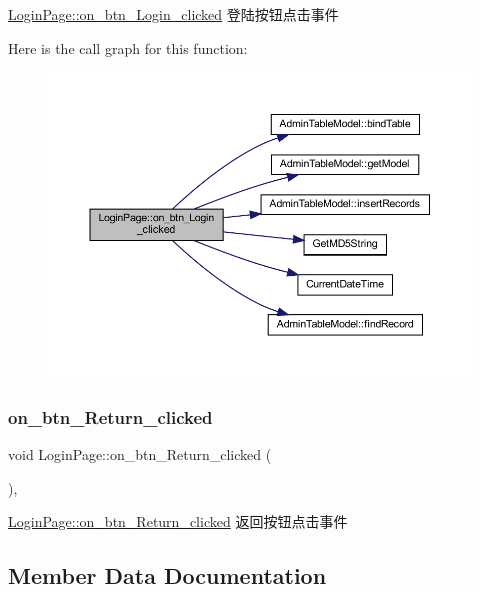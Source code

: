 \mbox{\hyperlink{class_login_page_a71d6fe164abd33be5b8cbf54baef3a1e}{Login\+Page\+::on\+\_\+btn\+\_\+\+Login\+\_\+clicked}} 登陆按钮点击事件 

Here is the call graph for this function\+:
\nopagebreak
\begin{figure}[H]
\begin{center}
\leavevmode
\includegraphics[width=350pt]{class_login_page_a71d6fe164abd33be5b8cbf54baef3a1e_cgraph}
\end{center}
\end{figure}
\mbox{\label{class_login_page_a084d6b451fc7302f0ef1e29ad34c2411}} 
\subsubsection{\texorpdfstring{on\_btn\_Return\_clicked}{on\_btn\_Return\_clicked}}
{\footnotesize\ttfamily void Login\+Page\+::on\+\_\+btn\+\_\+\+Return\+\_\+clicked (\begin{DoxyParamCaption}{ }\end{DoxyParamCaption})\hspace{0.3cm}{\ttfamily [private]}, {\ttfamily [slot]}}



\mbox{\hyperlink{class_login_page_a084d6b451fc7302f0ef1e29ad34c2411}{Login\+Page\+::on\+\_\+btn\+\_\+\+Return\+\_\+clicked}} 返回按钮点击事件 



\subsection{Member Data Documentation}
\mbox{\label{class_login_page_ad452fd2d3b8b8268789b300e49b67a8f}} 

